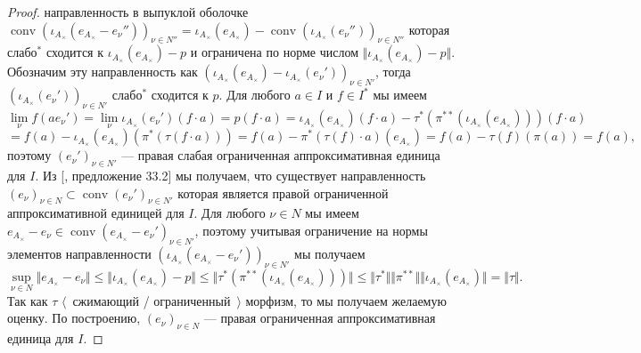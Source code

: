 \begin{proof}
направленность в выпуклой оболочке 
$\operatorname{conv}{(\iota_{A_\times}(e_{A_\times }-e_\nu''))}_{\nu\in N''}
=\iota_{A_\times }(e_{A_\times})
-\operatorname{conv}{(\iota_{A_\times }(e_\nu''))}_{\nu\in N''}$ которая
слабо${}^*$ сходится к $\iota_{A_\times }(e_{A_\times })-p$ и ограничена по
норме числом $\Vert \iota_{A_\times }(e_{A_\times })-p\Vert$. Обозначим эту
направленность как 
${(\iota_{A_\times }(e_{A_\times })-\iota_{A_\times}(e_\nu'))}_{\nu\in N'}$, 
тогда ${(\iota_{A_\times }(e_\nu'))}_{\nu\in N'}$
слабо${}^*$ сходится к $p$. Для любого $a\in I$ и $f\in I^*$ мы имеем
$$
\lim_{\nu}f(ae_\nu')
=\lim_{\nu}\iota_{A_\times }(e_\nu')(f\cdot a)
=p(f\cdot a)
=\iota_{A_\times }(e_{A_\times })(f\cdot a)
-\tau^*(\pi^{**}(\iota_{A_\times }(e_{A_\times })))(f\cdot a)
$$
$$
=f(a)-\iota_{A_\times }(e_{A_\times })(\pi^*(\tau(f\cdot a)))
=f(a)-\pi^*(\tau(f)\cdot a)(e_{A_\times })
=f(a)-\tau(f)(\pi(a))
=f(a),
$$
поэтому ${(e_\nu')}_{\nu\in N'}$ --- правая слабая ограниченная аппроксимативная
единица для $I$. Из [\cite{AppIdAndFactorInBanAlg}, предложение 33.2] мы
получаем, что существует направленность 
${(e_\nu)}_{\nu\in N}\subset\operatorname{conv}{(e_\nu')}_{\nu\in N'}$ 
которая является правой
ограниченной аппроксимативной единицей для $I$. Для любого $\nu\in N$ мы имеем
$e_{A_\times }-e_\nu\in\operatorname{conv}{(e_{A_\times }-e_\nu')}_{\nu\in N'}$,
поэтому учитывая ограничение на нормы элементов направленности 
${(\iota_{A_\times}(e_{A_\times }-e_\nu'))}_{\nu\in N'}$ мы получаем
$$
\sup_{\nu\in N}\Vert e_{A_\times }-e_\nu\Vert
\leq\Vert \iota_{A_\times }(e_{A_\times })-p\Vert
\leq\Vert\tau^*(\pi^{**}(\iota_{A_\times }(e_{A_\times })))\Vert
\leq\Vert\tau^*\Vert\Vert\pi^{**}\Vert\Vert\iota_{A_\times }(e_{A_\times })\Vert
=\Vert\tau\Vert.
$$
Так как $\tau$ $\langle$~сжимающий / ограниченный~$\rangle$ морфизм, то мы
получаем желаемую оценку. По построению, ${(e_\nu)}_{\nu\in N}$ --- правая
ограниченная аппроксимативная единица для $I$.


\end{proof}
